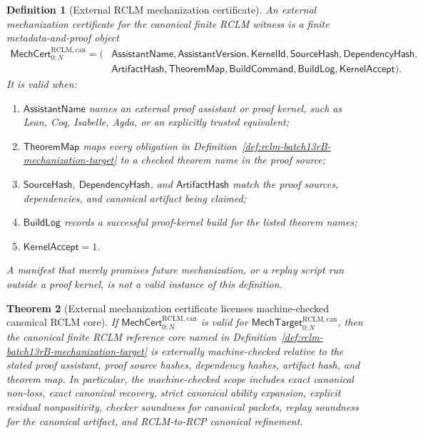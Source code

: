 \documentclass[11pt,a4paper]{article}
\newtheorem{theorem}{Theorem}[section]
\newtheorem{definition}[theorem]{Definition}
\newcommand{\RCLM}{\mathrm{RCLM}}
\begin{document}
\begin{definition}[External RCLM mechanization certificate]
\label{def:rclm-batch13rB-mechanization-certificate}
An external mechanization certificate for the canonical finite RCLM witness is a finite metadata-and-proof object
\[
\begin{aligned}
\mathsf{MechCert}_{0:N}^{\RCLM,\mathrm{can}}=(&
\mathsf{AssistantName},\mathsf{AssistantVersion},\mathsf{KernelId},
\mathsf{SourceHash},\mathsf{DependencyHash},\\
&\mathsf{ArtifactHash},\mathsf{TheoremMap},\mathsf{BuildCommand},
\mathsf{BuildLog},\mathsf{KernelAccept}).
\end{aligned}
\]
It is valid when:
\begin{enumerate}[label=(\roman*),leftmargin=1.5em]
    \item \(\mathsf{AssistantName}\) names an external proof assistant or proof kernel, such as Lean, Coq, Isabelle, Agda, or an explicitly trusted equivalent;
    \item \(\mathsf{TheoremMap}\) maps every obligation in Definition~\ref{def:rclm-batch13rB-mechanization-target} to a checked theorem name in the proof source;
    \item \(\mathsf{SourceHash}\), \(\mathsf{DependencyHash}\), and \(\mathsf{ArtifactHash}\) match the proof sources, dependencies, and canonical artifact being claimed;
    \item \(\mathsf{BuildLog}\) records a successful proof-kernel build for the listed theorem names;
    \item \(\mathsf{KernelAccept}=1\).
\end{enumerate}
A manifest that merely promises future mechanization, or a replay script run outside a proof kernel, is not a valid instance of this definition.
\end{definition}

\begin{theorem}[External mechanization certificate licenses machine-checked canonical RCLM core]
\label{thm:rclm-batch13rB-mechanization-certificate-soundness}
If \(\mathsf{MechCert}_{0:N}^{\RCLM,\mathrm{can}}\) is valid for \(\mathsf{MechTarget}_{0:N}^{\RCLM,\mathrm{can}}\), then the canonical finite RCLM reference core named in Definition~\ref{def:rclm-batch13rB-mechanization-target} is externally machine-checked relative to the stated proof assistant, proof source hashes, dependency hashes, artifact hash, and theorem map.  In particular, the machine-checked scope includes exact canonical non-loss, exact canonical recovery, strict canonical ability expansion, explicit residual nonpositivity, checker soundness for canonical packets, replay soundness for the canonical artifact, and RCLM-to-RCP canonical refinement.
\end{theorem}
\end{document}

